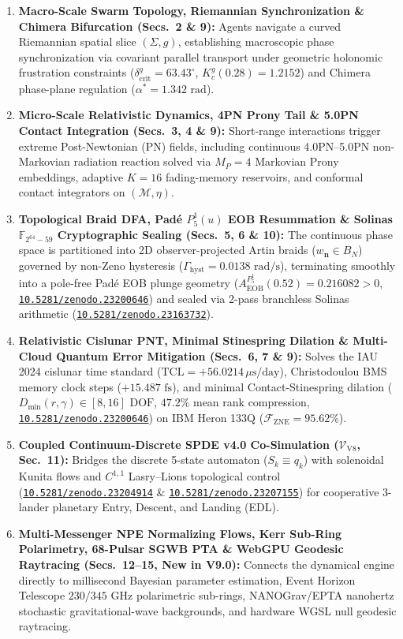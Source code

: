 \documentclass[11pt,a4paper,reqno]{article}
\newcommand{\zenodo}[1]{\href{https://doi.org/10.5281/zenodo.#1}{\texttt{10.5281/zenodo.#1}}}
\theoremstyle{plain}
\theoremstyle{definition}
\theoremstyle{remark}
\numberwithin{equation}{section}
\begin{document}
\begin{enumerate}
    \item \textbf{Macro-Scale Swarm Topology, Riemannian Synchronization \& Chimera Bifurcation (Secs.~2 \& 9):} Agents navigate a curved Riemannian spatial slice $(\Sigma, g)$, establishing macroscopic phase synchronization via covariant parallel transport under geometric holonomic frustration constraints ($\delta_{\mathrm{crit}}^g = 63.43^\circ$, $K_c^g(0.28) = 1.2152$) and Chimera phase-plane regulation ($\alpha^* = 1.342\text{ rad}$).
    \item \textbf{Micro-Scale Relativistic Dynamics, 4PN Prony Tail \& 5.0PN Contact Integration (Secs.~3, 4 \& 9):} Short-range interactions trigger extreme Post-Newtonian (PN) fields, including continuous 4.0PN--5.0PN non-Markovian radiation reaction solved via $M_P = 4$ Markovian Prony embeddings, adaptive $K=16$ fading-memory reservoirs, and conformal contact integrators on $(\mathcal{M}, \eta)$.
    \item \textbf{Topological Braid DFA, Padé $P^1_5(u)$ EOB Resummation \& Solinas $\mathbb{F}_{2^{64}-59}$ Cryptographic Sealing (Secs.~5, 6 \& 10):} The continuous phase space is partitioned into 2D observer-projected Artin braids ($w_{\mathbf{n}} \in B_N$) governed by non-Zeno hysteresis ($\Gamma_{\mathrm{hyst}} = 0.0138\text{ rad/s}$), terminating smoothly into a pole-free Padé EOB plunge geometry ($A_{\mathrm{EOB}}^{P^1_5}(0.52) = 0.216082 > 0$, \zenodo{23200646}) and sealed via 2-pass branchless Solinas arithmetic (\zenodo{23163732}).
    \item \textbf{Relativistic Cislunar PNT, Minimal Stinespring Dilation \& Multi-Cloud Quantum Error Mitigation (Secs.~6, 7 \& 9):} Solves the IAU 2024 cislunar time standard ($\mathrm{TCL} = +56.0214\,\mu\mathrm{s/day}$), Christodoulou BMS memory clock steps ($+15.487\text{ fs}$), and minimal Contact-Stinespring dilation ($D_{\min}(r,\gamma) \in [8,16]\text{ DOF}$, $47.2\%$ mean rank compression, \zenodo{23200646}) on IBM Heron 133Q ($\mathcal{F}_{\mathrm{ZNE}} = 95.62\%$).
    \item \textbf{Coupled Continuum-Discrete SPDE v4.0 Co-Simulation ($\mathcal{V}_{\mathrm{V8}}$, Sec.~11):} Bridges the discrete 5-state automaton ($S_k \equiv q_k$) with solenoidal Kunita flows and $C^{1,1}$ Lasry--Lions topological control (\zenodo{23204914} \& \zenodo{23207155}) for cooperative 3-lander planetary Entry, Descent, and Landing (EDL).
    \item \textbf{Multi-Messenger NPE Normalizing Flows, Kerr Sub-Ring Polarimetry, 68-Pulsar SGWB PTA \& WebGPU Geodesic Raytracing (Secs.~12--15, New in V9.0):} Connects the dynamical engine directly to millisecond Bayesian parameter estimation, Event Horizon Telescope $230/345\text{ GHz}$ polarimetric sub-rings, NANOGrav/EPTA nanohertz stochastic gravitational-wave backgrounds, and hardware WGSL null geodesic raytracing.
\end{enumerate}
\end{document}
